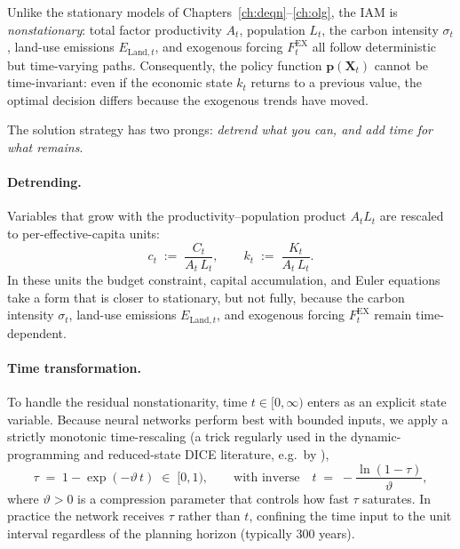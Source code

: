 \documentclass[11pt,a4paper]{report}
\begin{document}
Unlike the stationary models of Chapters~\ref{ch:deqn}--\ref{ch:olg}, the IAM is \emph{nonstationary}: total factor productivity $A_t$, population $L_t$, the carbon intensity $\sigma_t$, land-use emissions $E_{\mathrm{Land},t}$, and exogenous forcing $F^{\mathrm{EX}}_t$ all follow deterministic but time-varying paths.  Consequently, the policy function $\bm{p}(\bm{X}_t)$ cannot be time-invariant: even if the economic state $k_t$ returns to a previous value, the optimal decision differs because the exogenous trends have moved.

The solution strategy has two prongs: \emph{detrend what you can, and add time for what remains}.

\paragraph{Detrending.}
Variables that grow with the productivity--population product $A_t L_t$ are rescaled to per-effective-capita units:
\begin{equation}
c_t \;:=\; \frac{C_t}{A_t\,L_t}, \qquad
k_t \;:=\; \frac{K_t}{A_t\,L_t}.
\label{eq:iam_detrend}
\end{equation}
In these units the budget constraint, capital accumulation, and Euler equations take a form that is closer to stationary, but not fully, because the carbon intensity $\sigma_t$, land-use emissions $E_{\mathrm{Land},t}$, and exogenous forcing $F^{\mathrm{EX}}_t$ remain time-dependent.

\paragraph{Time transformation.}
To handle the residual nonstationarity, time $t \in [0,\infty)$ enters as an explicit state variable.  Because neural networks perform best with bounded inputs, we apply a strictly monotonic time-rescaling (a trick regularly used in the dynamic-programming and reduced-state DICE literature, e.g.\ by \citet{traeger4StatedDICEQuantitatively2014}),
\begin{equation}
\tau \;=\; 1 - \exp(-\vartheta\, t) \;\in\; [0,1),
\qquad\text{with inverse}\quad
t \;=\; -\frac{\ln(1-\tau)}{\vartheta},
\label{eq:time_transform}
\end{equation}
where $\vartheta > 0$ is a compression parameter that controls how fast $\tau$ saturates.  In practice the network receives $\tau$ rather than $t$, confining the time input to the unit interval regardless of the planning horizon (typically 300 years).
\end{document}
